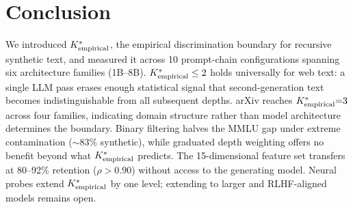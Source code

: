 \section{Conclusion}
\label{sec:conclusion}

We introduced ${K^*_{\text{empirical}}}$, the empirical discrimination boundary for recursive synthetic text, and measured it across 10 prompt-chain configurations spanning six architecture families (1B--8B).
${K^*_{\text{empirical}}} \leq 2$ holds universally for web text: a single LLM pass erases enough statistical signal that second-generation text becomes indistinguishable from all subsequent depths.
arXiv reaches ${K^*_{\text{empirical}}}{=}3$ across four families, indicating domain structure rather than model architecture determines the boundary.
Binary filtering halves the MMLU gap under extreme contamination (${\sim}$83\% synthetic), while graduated depth weighting offers no benefit beyond what ${K^*_{\text{empirical}}}$ predicts.
The 15-dimensional feature set transfers at 80--92\% retention ($\rho > 0.90$) without access to the generating model.
Neural probes extend ${K^*_{\text{empirical}}}$ by one level; extending to larger and RLHF-aligned models remains open.
